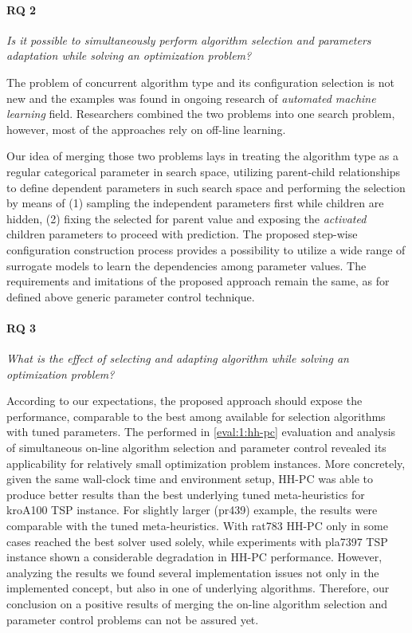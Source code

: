 \paragraph{RQ 2} \emph{Is it possible to simultaneously perform algorithm selection and parameters adaptation while solving an optimization problem?}
	
The problem of concurrent algorithm type and its configuration selection is not new and the examples was found in ongoing research of \emph{automated machine learning} field. Researchers combined the two problems into one search problem, however, most of the approaches rely on off-line learning. 
	
Our idea of merging those two problems lays in treating the algorithm type as a regular categorical parameter in search space, utilizing parent-child relationships to define dependent parameters in such search space and performing the selection by means of (1) sampling the independent parameters first while children are hidden, (2) fixing the selected for parent value and exposing the \emph{activated} children parameters to proceed with prediction. The proposed step-wise configuration construction process provides a possibility to utilize a wide range of surrogate models to learn the dependencies among parameter values. The requirements and imitations of the proposed approach remain the same, as for defined above generic parameter control technique.
	
\paragraph{RQ 3} \emph{What is the effect of selecting and adapting algorithm while solving an optimization problem?}

According to our expectations, the proposed approach should expose the performance, comparable to the best among available for selection algorithms with tuned parameters. The performed in \cref{eval:1:hh-pc} evaluation and analysis of simultaneous on-line algorithm selection and parameter control revealed its applicability for relatively small optimization problem instances. More concretely, given the same wall-clock time and environment setup, HH-PC was able to produce better results than the best underlying tuned meta-heuristics for kroA100 TSP instance. For slightly larger (pr439) example, the results were comparable with the tuned meta-heuristics. With rat783 HH-PC only in some cases reached the best solver used solely, while experiments with pla7397 TSP instance shown a considerable degradation in HH-PC performance. However, analyzing the results we found several implementation issues not only in the implemented concept, but also in one of underlying algorithms. Therefore, our conclusion on a positive results of merging the on-line algorithm selection and parameter control problems can not be assured yet.

